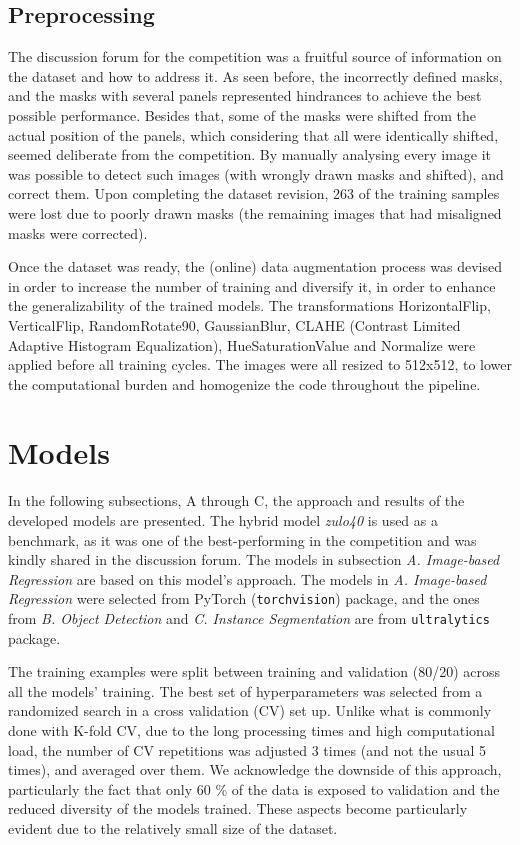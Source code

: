 \documentclass[conference]{IEEEtran}
\begin{document}
\subsection{Preprocessing}

The discussion forum for the competition was a fruitful source of information on the dataset and how to address it. As seen before, the incorrectly defined masks, and the masks with several panels represented hindrances to achieve the best possible performance. Besides that, some of the masks were shifted from the actual position of the panels, which considering that all were identically shifted, seemed deliberate from the competition. By manually analysing every image  it was possible to detect such images (with wrongly drawn masks and shifted), and correct them. Upon completing the dataset revision, 263 of the training samples were lost due to poorly drawn masks (the remaining images that had misaligned masks were corrected).

Once the dataset was ready, the (online) data augmentation process was devised in order to increase the number of training and diversify it, in order to enhance the generalizability of the trained models. The transformations HorizontalFlip, VerticalFlip, RandomRotate90, GaussianBlur, CLAHE (Contrast Limited Adaptive Histogram Equalization), HueSaturationValue and Normalize were applied before all training cycles. The images were all resized to 512x512, to lower the computational burden and homogenize the code throughout the pipeline. 

\section{Models}

In the following subsections, A through C, the approach and results of the developed models are presented. The hybrid model \textit{zulo40} is used as a benchmark, as it was one of the best-performing in the competition and was kindly shared in the discussion forum. The models in subsection \textit{A. Image-based Regression} are based on this model's approach. The models in \textit{A. Image-based Regression} were selected from PyTorch (\texttt{torchvision}) package, and the ones from \textit{B. Object Detection} and \textit{C. Instance Segmentation} are from \texttt{ultralytics} package.

The training examples were split between training and validation (80/20) across all the models' training. The best set of hyperparameters was selected from a randomized search in a cross validation (CV) set up. Unlike what is commonly done with K-fold CV, due to the long processing times and high computational load, the number of CV repetitions was adjusted 3 times (and not the usual 5 times), and averaged over them. We acknowledge the downside of this approach, particularly the fact that only 60 \% of the data is exposed to validation and the reduced diversity of the models trained. These aspects become particularly evident due to the relatively small size of the dataset.
\end{document}
